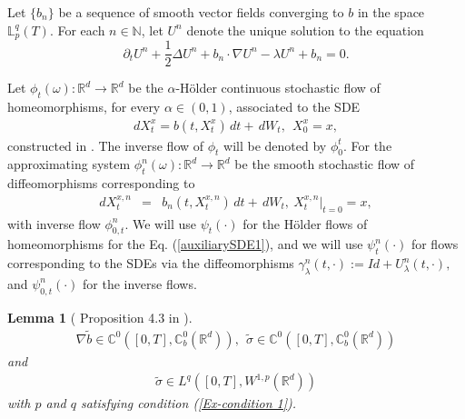 \documentclass[12pt,oneside, reqno]{amsart}
\newcommand{\be}{\begin{eqnarray}}
\newcommand{\ee}{\end{eqnarray}}
\newcommand{\ce}{\begin{eqnarray*}}
\newcommand{\de}{\end{eqnarray*}}
\newtheorem{lemma}[theorem]{Lemma}
\def\mC{{\mathbb C}}
\def\mL{{\mathbb L}}
\def\mN{{\mathbb N}}
\def\mR{{\mathbb R}}
\numberwithin{equation}{section}
\begin{document}
Let $\{b_n\}$ be a sequence of smooth vector fields converging to $b$ in the space $\mL_p^q(T)$. For each $n\in\mN$, let $U^n$ denote the unique solution to the equation
$$
\partial_t U^n+\frac{1}{2}\Delta U^n+b_n\cdot \nabla U^n-\lambda U^n+b_n=0.
$$

Let $\phi_t(\omega):\mR^d\to \mR^d$ be the $\alpha$-H\"{o}lder continuous stochastic flow of homeomorphisms, for every $\alpha\in(0,1)$, associated to the SDE
\ce
dX_t^x=b(t,X_t^x)\,dt+\,dW_t,~~X_0^x=x,
\de
constructed in \cite{Flandoli-2013}. The inverse flow of $\phi_t$ will be denoted by $\phi_0^t$.  For the approximating system $\phi_t^n(\omega):\mR^d\to \mR^d$ be the smooth stochastic flow of diffeomorphisms corresponding to
\be\label{Appro-b-Eq1}
dX_t^{x,n}&=&b_n(t,X_t^{x,n})\,dt+\,dW_t,~X_t^{x,n}\big|_{t=0}=x,
\ee
with inverse flow  $\phi_{0,t}^n$.    We will use $\psi_t(\cdot)$ for the H\"older flows of homeomorphisms for the Eq. (\ref{auxiliarySDE1}), and we will use $\psi_t^n(\cdot)$
for flows corresponding to the SDEs via the diffeomorphisms $\gamma_\lambda^n(t,\cdot):=Id+U_\lambda^n(t,\cdot),$ and  $\psi_{0,t}^n(\cdot)$ for the inverse flows.



\begin{lemma}[ Proposition 4.3 in \cite{Flandoli-2013}]
	\be\label{tilde b-1} 
	\nabla \tilde{b} \in \mC^0([0,T], \mC_b^0(\mR^d)),~~ \tilde{\sigma} \in \mC^0([0,T], \mC_b^0(\mR^d))
	\ee 
	and 
		\be\label{tilde sigma-1} 
	\tilde{\sigma} \in L^q([0,T], W^{1,p}(\mR^d)) 
	\ee
	with $p$ and $q$ satisfying condition (\ref{Ex-condition 1}).
\end{lemma}
\end{document}
